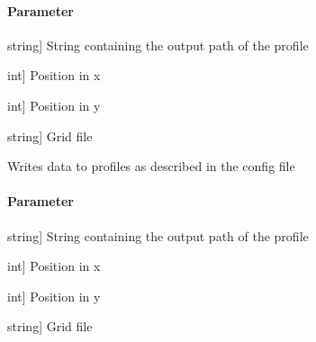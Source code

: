 \documentclass[letterpaper,10pt,english]{sphinxmanual}
\begin{document}
\begin{fulllineitems}
\begin{fulllineitems}
\paragraph{Parameter}
\label{\detokenize{classes:id43}}\begin{description}
\sphinxlineitem{filename}{[}string{]}
\sphinxAtStartPar
String containing the output path of the profile

\sphinxlineitem{x}{[}int{]}
\sphinxAtStartPar
Position in x

\sphinxlineitem{y}{[}int{]}
\sphinxAtStartPar
Position in y

\sphinxlineitem{Grid}{[}string{]}
\sphinxAtStartPar
Grid file

\end{description}

\end{fulllineitems}


\begin{fulllineitems}
\label{\detokenize{classes:profile_stk.Profile.write_profile_mc}}
\pysigstartsignatures
{}
\pysigstopsignatures
\sphinxAtStartPar
Writes data to profiles as described in the config file


\paragraph{Parameter}
\label{\detokenize{classes:id44}}\begin{description}
\sphinxlineitem{filename}{[}string{]}
\sphinxAtStartPar
String containing the output path of the profile

\sphinxlineitem{x}{[}int{]}
\sphinxAtStartPar
Position in x

\sphinxlineitem{y}{[}int{]}
\sphinxAtStartPar
Position in y

\sphinxlineitem{Grid}{[}string{]}
\sphinxAtStartPar
Grid file

\end{description}

\end{fulllineitems}



\end{fulllineitems}
\end{document}
